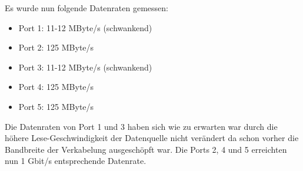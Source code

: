 \documentclass[11pt,a4paper,titlepage]{scrartcl} %
\begin{document}
Es wurde nun folgende Datenraten gemessen:
\begin{itemize}
\item Port 1: 11-12 MByte/s (schwankend)
\item Port 2: 125 MByte/s
\item Port 3: 11-12 MByte/s (schwankend)
\item Port 4: 125 MByte/s
\item Port 5: 125 MByte/s
\end{itemize}
Die Datenraten von Port 1 und 3 haben sich wie zu erwarten war durch die höhere Lese-Geschwindigkeit der Datenquelle nicht verändert da schon vorher die Bandbreite der Verkabelung ausgeschöpft war. Die Ports 2, 4 und 5 erreichten nun 1 Gbit/s entsprechende Datenrate.
\end{document}
